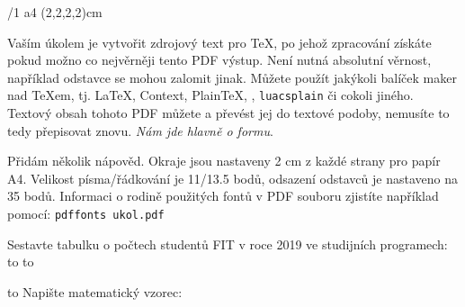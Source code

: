 \fontfam[Schola]

\typosize[11/13.5]

\margins/1 a4 (2,2,2,2)cm
\cslang
\parindent 1.22cm

\nopagenumbers

\hyperlinks \Blue \Blue


Vaším úkolem je vytvořit zdrojový text pro \TeX, po jehož zpracování získáte pokud možno co nejvěrněji tento PDF výstup. Není nutná absolutní věrnost, například odstavce se mohou zalomit jinak. Můžete použít jakýkoli balíček maker nad {\TeX}em, tj. \LaTeX, Context, Plain{\TeX}, {\OpTeX}, {\tt luacsplain} či cokoli jiného. Textový obsah tohoto PDF můžete  a převést jej do textové podoby, nemusíte to tedy přepisovat znovu. {\it Nám jde hlavně o formu}.

Přidám několik nápověd. Okraje jsou nastaveny 2 cm z každé strany pro papír A4. Velikost písma/řádkování je 11/13.5 bodů, odsazení odstavců je nastaveno na 35 bodů. Informaci o rodině použitých fontů v PDF souboru zjistíte například pomocí:
\medskip %
{\tt pdffonts ukol.pdf}
\medskip


Sestavte tabulku o počtech studentů FIT v roce 2019 ve studijních programech:
\bigskip
\hbox to
\medskip
\hbox to

\bigskip
\hbox to
\bigskip
Napište matematický vzorec:

